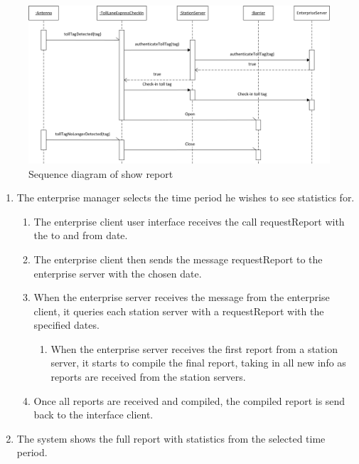 \documentclass[11pt]{article}
\begin{document}
\begin{figure}[h]
\centering
\includegraphics[width=0.7\linewidth]{../report/img/sequence_diagrams/sequence_diagram_toll_tag_check_in.png}
\caption[fig1]{Sequence diagram of show report}
\label{fig1}
\end{figure}

\begin{enumerate}
\item The enterprise manager selects the time period he wishes to see statistics for.

\begin{enumerate}
\item The enterprise client user interface receives the call requestReport with the to and from date.
\item The enterprise client then sends the message requestReport to the enterprise server with the chosen date.
\item When the enterprise server receives the message from the enterprise client, it queries each station server with a requestReport with the specified dates.
\begin{enumerate}
\item When the enterprise server receives the first report from a station server, it starts to compile the final report, taking in all new info as reports are received from the station servers.
\end{enumerate}
\item Once all reports are received and compiled, the compiled report is send back to the interface client.
\end{enumerate}
\item The system shows the full report with statistics from the selected time period.
\end{enumerate}
\end{document}
